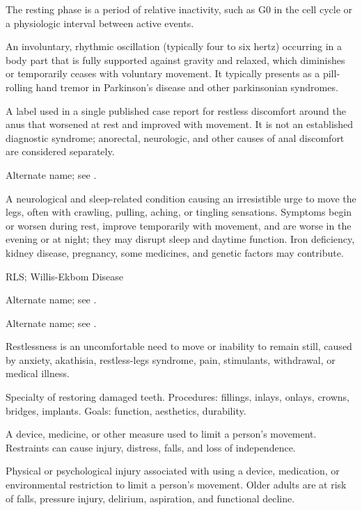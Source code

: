  The resting phase is a period of relative inactivity, such as G0 in the cell cycle or a physiologic interval between active events.

 An involuntary, rhythmic oscillation (typically four to six hertz) occurring in a body part that is fully supported against gravity and relaxed, which diminishes or temporarily ceases with voluntary movement. It typically presents as a pill-rolling hand tremor in Parkinson's disease and other parkinsonian syndromes.

 A label used in a single published case report for restless discomfort around the anus that worsened at rest and improved with movement. It is not an established diagnostic syndrome; anorectal, neurologic, and other causes of anal discomfort are considered separately.

 Alternate name; see .

 A neurological and sleep-related condition causing an irresistible urge to move the legs, often with crawling, pulling, aching, or tingling sensations. Symptoms begin or worsen during rest, improve temporarily with movement, and are worse in the evening or at night; they may disrupt sleep and daytime function. Iron deficiency, kidney disease, pregnancy, some medicines, and genetic factors may contribute.

\synonyms
RLS; Willis-Ekbom Disease

 Alternate name; see .

 Alternate name; see .

 Restlessness is an uncomfortable need to move or inability to remain still, caused by anxiety, akathisia, restless-legs syndrome, pain, stimulants, withdrawal, or medical illness.

 Specialty of restoring damaged teeth. Procedures: fillings, inlays, onlays, crowns,
bridges, implants. Goals: function, aesthetics, durability.

 A device, medicine, or other measure used to limit a person’s movement. Restraints can cause injury, distress, falls, and loss of independence.

 Physical or psychological injury associated with using a device, medication, or
environmental restriction to limit a person's movement. Older adults are at risk of
falls, pressure injury, delirium, aspiration, and functional decline.

